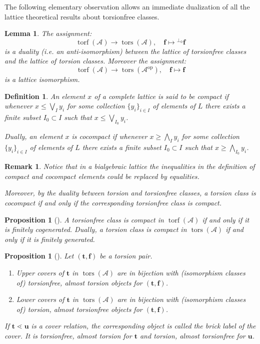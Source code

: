 \documentclass[10pt,a4paper]{amsart}
\newtheorem{proposition}[theorem]{Proposition}
\newtheorem{lemma}[theorem]{Lemma}
\newtheorem{definition}[theorem]{Definition}
\newtheorem{remark}[theorem]{Remark}
\newcommand{\A}{\mathcal A}
\newcommand{\tors}{\operatorname{tors}}
\newcommand{\torf}{\operatorname{torf}}
\begin{document}
The following elementary observation allows an immediate dualization of all the lattice theoretical results about torsionfree classes.

\begin{lemma}
The assignment:
\[
	\torf(\A) \to \tors(\A), \quad \mathbf{f} \mapsto {}^{\perp_0}\mathbf{f}
\]
is a duality (i.e. an anti-isomorphism) between the lattice of torsionfree classes and the lattice of torsion classes. 
Moreover the assignment:
\[
	\torf(\A) \to \tors(\A^{\mathrm{op}}), \quad \mathbf{f} \mapsto \mathbf{f}
\]
is a lattice isomorphism.
\end{lemma}

\begin{definition}
An element \( x \) of a complete lattice is said to be \emph{compact} if whenever \( x \le \bigvee_I y_i \) for some collection \( \{ y_i \}_{i \in I} \) of elements of \( L \) there exists a finite subset \( I_0 \subset I \) such that \( x \le \bigvee_{I_0} y_i \). 

Dually, an element \( x \) is \emph{cocompact} if whenever \( x \ge \bigwedge_I y_i \)  for some collection \( \{ y_i \}_{i \in I} \) of elements of \( L \) there exists a finite subset \( I_0 \subset I \) such that \( x \ge \bigwedge_{I_0} y_i \). 
\end{definition}

\begin{remark}
Notice that in a bialgebraic lattice the inequalities in the definition of compact and cocompact elements could be replaced by equalities.

Moreover, by the duality between torsion and torsionfree classes, a torsion class is cocompact if and only if the corresponding torsionfree class is compact. 
\end{remark}

\begin{proposition}[{\cite[Proposition 3.2]{DIRRT}}]\label{prop:compact-finitely-generated}
A torsionfree class is compact in \(\torf(\A)\) if and only if it is finitely cogenerated. Dually, a torsion class is compact in \(\tors(\A)\) if and only if it is finitely generated.
\end{proposition}

\begin{proposition}[{\cite[Theorem 1.0.2, Theorem 2.3.2]{BCZ}}]\label{prop:brick-labels-covers}
Let \((\mathbf t,\mathbf f)\) be a torsion pair.
\begin{enumerate}[label=\textup{(\arabic*)},leftmargin=2.5em]
\item Upper covers of \(\mathbf t\) in \(\tors(\A)\) are in bijection with (isomorphism classes of) torsionfree, almost torsion objects for \((\mathbf t,\mathbf f)\).
\item Lower covers of \(\mathbf t\) in \(\tors(\A)\) are in bijection with (isomorphism classes of) torsion, almost torsionfree objects for \((\mathbf t,\mathbf f)\).
\end{enumerate}
If \(\mathbf t\lessdot \mathbf u\) is a cover relation, the corresponding object is called the brick label of the cover. It is torsionfree, almost torsion for \(\mathbf t\) and torsion, almost torsionfree for \(\mathbf u\).
\end{proposition}
\end{document}
